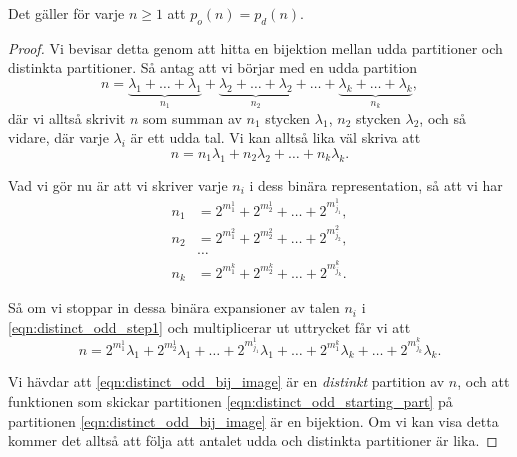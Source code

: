 \documentclass[nobib]{tufte-handout}
\begin{document}
\begin{theorem}\label{thm:odd_distinct_partitions}
  Det gäller för varje $n \geq 1$ att $p_o(n) = p_d(n)$.

  \begin{proof}
    Vi bevisar detta genom att hitta en bijektion mellan udda partitioner och distinkta partitioner. Så antag att vi börjar med en udda partition
    \begin{equation}\label{eqn:distinct_odd_starting_part}
      n = \underbrace{\lambda_1 + \ldots + \lambda_1}_{n_1} + \underbrace{\lambda_2 + \ldots + \lambda_2}_{n_2} + \ldots + \underbrace{\lambda_k + \ldots + \lambda_k}_{n_k},
    \end{equation}
    där vi alltså skrivit $n$ som summan av $n_1$ stycken $\lambda_1$, $n_2$ stycken $\lambda_2$, och så vidare, där varje $\lambda_i$ är ett udda tal. Vi kan alltså lika väl skriva att
    \begin{equation}\label{eqn:distinct_odd_step1}
      n = n_1 \lambda_1 + n_2 \lambda_2 + \ldots + n_k \lambda_k.
    \end{equation}

    Vad vi gör nu är att vi skriver varje $n_i$ i dess binära representation, så att vi har
    \begin{align*}
      n_1 &= 2^{m_1^1} + 2^{m_2^1} + \ldots + 2^{m_{j_1}^1},\\
      n_2 &= 2^{m_1^2} + 2^{m_2^2} + \ldots + 2^{m_{j_2}^2},\\
      &\ldots\\
      n_k &= 2^{m_1^k} + 2^{m_2^k} + \ldots + 2^{m_{j_k}^k}.
    \end{align*}

    Så om vi stoppar in dessa binära expansioner av talen $n_i$ i \eqref{eqn:distinct_odd_step1} och multiplicerar ut uttrycket får vi att
    \begin{equation}\label{eqn:distinct_odd_bij_image}
      n = 2^{m_1^1}\lambda_1 + 2^{m_2^1}\lambda_1 + \ldots + 2^{m_{j_1}^1}\lambda_1 + \ldots + 2^{m_1^k}\lambda_k + \ldots + 2^{m_{j_k}^k}\lambda_k.
    \end{equation}

    Vi hävdar att \eqref{eqn:distinct_odd_bij_image} är en \emph{distinkt} partition av $n$, och att funktionen som skickar partitionen \eqref{eqn:distinct_odd_starting_part} på partitionen \eqref{eqn:distinct_odd_bij_image} är en bijektion. Om vi kan visa detta kommer det alltså att följa att antalet udda och distinkta partitioner är lika.


\end{proof}
\end{theorem}
\end{document}
